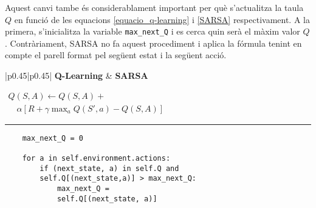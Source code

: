 \documentclass{article}
\begin{document}
\begin{itemize}
    Aquest canvi tambe és considerablament important per què s'actualitza la taula \(Q\) en funció de les equacions \ref{equacio_q-learning} i \ref{SARSA} respectivament. A la primera, s'inicialitza la variable \verb|max_next_Q| i es cerca quin serà el màxim valor \(Q\). Contràriament, SARSA no fa aquest procediment i aplica la fórmula tenint en compte el parell format pel següent estat i la següent acció.
    \begin{table}[h]
\begin{tabular}{|p{0.45\textwidth}|p{0.45\textwidth}|}
\hline
\textbf{Q-Learning} & \textbf{SARSA} \\
\hline
\begin{minipage}{\linewidth}
\begin{algorithmic}[H]
\STATE $\begin{aligned}
Q(S,A) \leftarrow Q(S,A) + \\
\quad \alpha[R + \gamma \max_a Q(S',a) - Q(S,A)]
\end{aligned}$
\end{algorithmic}
\noindent\rule{\linewidth}{0.4pt} 
\begin{verbatim}
    max_next_Q = 0
                
    for a in self.environment.actions:
        if (next_state, a) in self.Q and
        self.Q[(next_state,a)] > max_next_Q:
            max_next_Q =
            self.Q[(next_state, a)]
                        

\end{verbatim}
\end{minipage}
\end{tabular}
\end{table}
\end{itemize}
\end{document}
